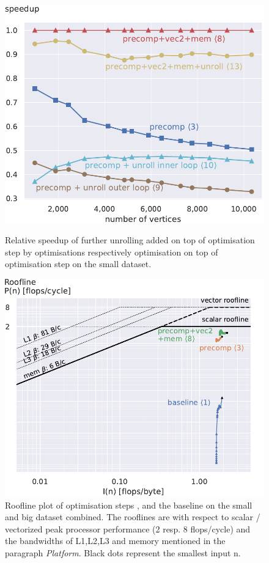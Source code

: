 \documentclass[letterpaper]{article}
\begin{document}
\begin{figure}[!t]
\begin{minipage}[t]{\oldlinewidth}\centering
	\includegraphics[width=\linewidth]{img/speedup[3][8][9][10][13]_small.pdf}
	\caption{Relative speedup of further unrolling added on top of optimisation step  by optimisations  respectively optimisation  on top of optimisation step  on the small dataset. \label{speedupUnsuccessful}}
\end{minipage}%
\hfil
\begin{minipage}[t]{\oldlinewidth}\centering
	\includegraphics[width=\linewidth]{img/roofline[1][3][8]_both.pdf}
	\caption{Roofline plot of optimisation steps ,  and the baseline  on the small and big dataset combined.
			The rooflines are with respect to scalar / vectorized peak processor performance (2 resp. 8 flops/cycle) and the bandwidths of L1,L2,L3 and memory mentioned in the paragraph \emph{Platform}. Black dots represent the smallest input n. \label{rooflineEndToEndSmall}}
\end{minipage}%
\end{figure}
\end{document}
